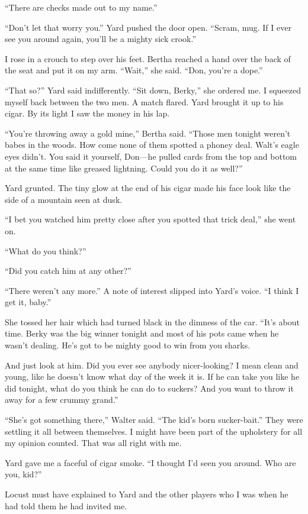 \documentclass{novel}
\begin{document}
“There are checks made out to my name.”

“Don’t let that worry you.” Yard pushed the door open. “Scram, mug. If I ever see you around again, you’ll be a mighty sick crook.”

I rose in a crouch to step over his feet. Bertha reached a hand over the back of the seat and put it on my arm. “Wait,” she said. “Don, you’re a dope.”

“That so?” Yard said indifferently. “Sit down, Berky,” she ordered me. I squeezed myself back between the two men. A match flared. Yard brought it up to his cigar. By its light I saw the money in his lap.

“You’re throwing away a gold mine,” Bertha said. “Those men tonight weren’t babes in the woods. How come none of them spotted a phoney deal. Walt’s eagle eyes didn’t. You said it yourself, Don—he pulled cards from the top and bottom at the same time like greased lightning. Could you do it as well?”

Yard grunted. The tiny glow at the end of his cigar made his face look like the side of a mountain seen at dusk.

“I bet you watched him pretty close after you spotted that trick deal,” she went on.

“What do you think?”

“Did you catch him at any other?”

“There weren’t any more.” A note of interest slipped into Yard’s voice. “I think I get it, baby.”

She tossed her hair which had turned black in the dimness of the car. “It’s about time. Berky was the big winner tonight and most of his pots came when he wasn’t dealing. He’s got to be mighty good to win from you sharks.

And just look at him. Did you ever see anybody nicer-looking? I mean clean and young, like he doesn’t know what day of the week it is. If he can take you like he did tonight, what do you think he can do to suckers? And you want to throw it away for a few crummy grand.”

“She’s got something there,” Walter said. “The kid’s born sucker-bait.” They were settling it all between themselves. I might have been part of the upholstery for all my opinion counted. That was all right with me.

Yard gave me a faceful of cigar smoke. “I thought I’d seen you around. Who are you, kid?”

Locust must have explained to Yard and the other players who I was when he had told them he had invited me.
\end{document}
